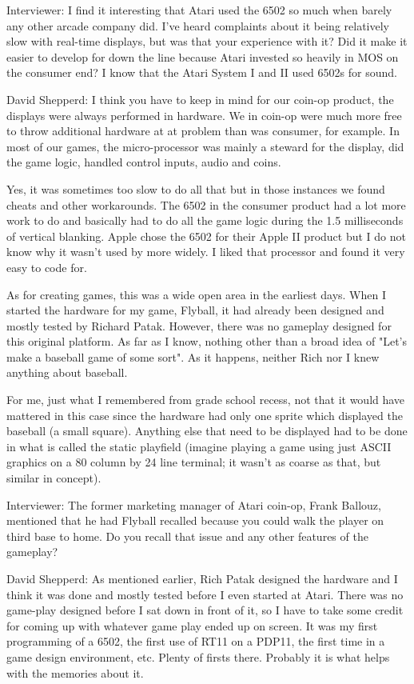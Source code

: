 \textcolor{interviewer}{Interviewer:} I find it interesting that Atari used the 6502 so much when barely any other arcade company did. I've heard complaints about it being relatively slow with real-time displays, but was that your experience with it? Did it make it easier to develop for down the line because Atari invested so heavily in MOS on the consumer end? I know that the Atari System I and II used 6502s for sound.

\textcolor{interviewee}{David Shepperd:} I think you have to keep in mind for our coin-op product, the displays were always performed in hardware. We in coin-op were much more free to throw additional hardware at at problem than was consumer, for example. In most of our games, the micro-processor was mainly a steward for the display, did the game logic, handled control inputs, audio and coins. 

Yes, it was sometimes too slow to do all that but in those instances we found cheats and other workarounds. The 6502 in the consumer product had a lot more work to do and basically had to do all the game logic during the 1.5 milliseconds of vertical blanking. Apple chose the 6502 for their Apple II product but I do not know why it wasn't used by more widely. I liked that processor and found it very easy to code for.

As for creating games, this was a wide open area in the earliest days. When I started the hardware for my game, Flyball, it had already been designed and mostly tested by Richard Patak. However, there was no gameplay designed for this original platform. As far as I know, nothing other than a broad idea of "Let's make a baseball game of some sort". As it happens, neither Rich nor I knew anything about baseball. 

For me, just what I remembered from grade school recess, not that it would have mattered in this case since the hardware had only one sprite which displayed the baseball (a small square). Anything else that need to be displayed had to be done in what is called the static playfield (imagine playing a game using just ASCII graphics on a 80 column by 24 line terminal; it wasn't as coarse as that, but similar in concept).

\textcolor{interviewer}{Interviewer:} The former marketing manager of Atari coin-op, Frank Ballouz, mentioned that he had Flyball recalled because you could walk the player on third base to home. Do you recall that issue and any other features of the gameplay?

\textcolor{interviewee}{David Shepperd:} As mentioned earlier, Rich Patak designed the hardware and I think it was done and mostly tested before I even started at Atari. There was no game-play designed before I sat down in front of it, so I have to take some credit for coming up with whatever game play ended up on screen. It was my first programming of a 6502, the first use of RT11 on a PDP11, the first time in a game design environment, etc. Plenty of firsts there. Probably it is what helps with the memories about it. 

